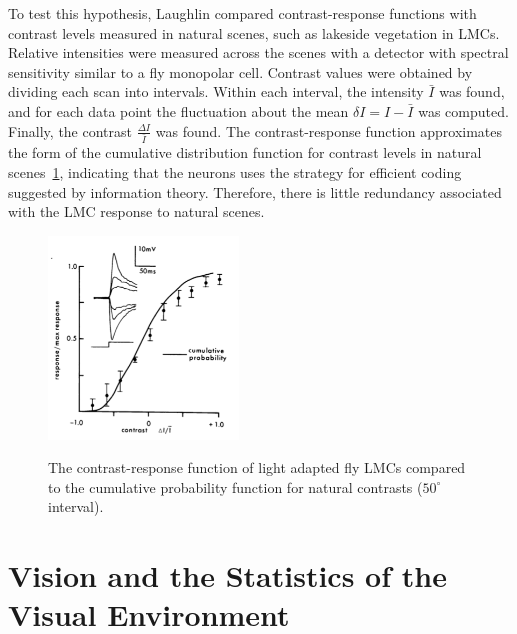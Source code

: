 \documentclass[twoside]{article}
\begin{document}
\begin{multicols}{2}
To test this hypothesis, Laughlin compared contrast-response functions with contrast levels measured in natural scenes, such as lakeside vegetation in LMCs. Relative intensities were measured across the scenes with a detector with spectral sensitivity similar to a fly monopolar cell. Contrast values were obtained by dividing each scan into intervals. Within each interval, the intensity $\bar{I}$ was found, and for each data point the fluctuation about the mean $\delta I = I - \bar{I}$ was computed. Finally, the contrast $\displaystyle\frac{\Delta I}{\bar{I}}$ was found. The contrast-response function approximates the form of the cumulative distribution function for contrast levels in natural scenes~\ref{fig:laughlin1981-fig2}, indicating that the neurons uses the strategy for efficient coding suggested by information theory. Therefore, there is little redundancy associated with the LMC response to natural scenes. 

\begin{figure}[H]
	\caption{
		The contrast-response function of light adapted fly LMCs compared to the cumulative probability function for natural contrasts ($50^\circ$ interval).
	}
	\includegraphics[width=0.45\textwidth]{laughlin1981-fig2}
	\label{fig:laughlin1981-fig2}
\end{figure}





\section{Vision and the Statistics of the Visual Environment}


\end{multicols}
\end{document}
